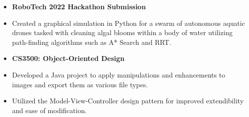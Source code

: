 \documentclass[10pt,a4paper,ragged2e,withhyper]{altacv}
\begin{document}
\begin{paracol}{2}
    \begin{itemize}
        \item[] \textbf{RoboTech 2022 Hackathon Submission}
        \item Created a graphical simulation in Python for a swarm of autonomous aquatic drones tasked with cleaning algal blooms within a body of water utilizing path-finding algorithms such as A* Search and RRT.
    \end{itemize}
    \begin{itemize}
        \item[] \textbf{CS3500: Object-Oriented Design}
        \item Developed a Java project to apply manipulations and enhancements to images and export them as various file types.
        \item Utilized the Model-View-Controller design pattern for improved extendibility and ease of modification.
    \end{itemize}




\end{paracol}
\end{document}
